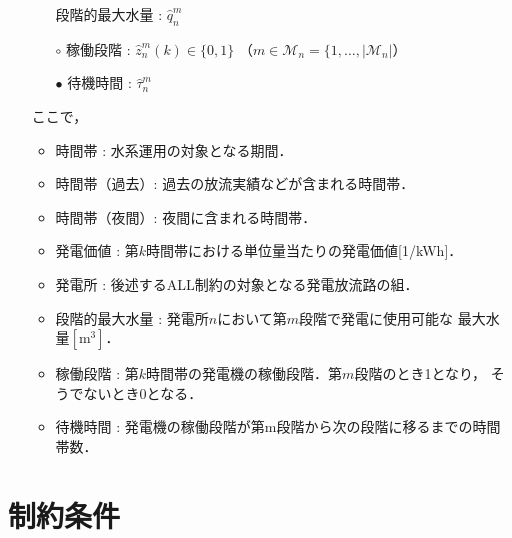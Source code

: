 \begin{itemize}
\begin{itemize}
			段階的最大水量 : $\hat{q}^{m}_{n} $
		\item[$\circ$]
			稼働段階 : $\hat{z}^{m}_{n} (k) \in \{ 0 , 1 \}$%
			（$m \in \mathcal M_{n} = \{1,\hdots,|\mathcal M_{n}|$）
		\item[$\bullet$]
			待機時間 : $\hat{\tau}^{m}_{n}$
	\end{itemize}
	ここで，
	\begin{itemize}
		\item 時間帯 : 水系運用の対象となる期間．
		\item 時間帯（過去）: 過去の放流実績などが含まれる時間帯．
		\item 時間帯（夜間）: 夜間に含まれる時間帯．
		\item 発電価値 : 第$k$時間帯における単位量当たりの発電価値[1/kWh]．
		\item 発電所 : 後述するALL制約の対象となる発電放流路の組．
		\item 段階的最大水量 : 発電所$n$において第$m$段階で発電に使用可能な%
		最大水量$[\mathrm m^3]$．
		\item 稼働段階 : 第$k$時間帯の発電機の稼働段階．第$m$段階のとき1となり，%
		そうでないとき0となる．
		\item 待機時間 : 発電機の稼働段階が第m段階から次の段階に移るまでの時間帯数．
	\end{itemize}	
\end{itemize}	
	
\section{制約条件}

